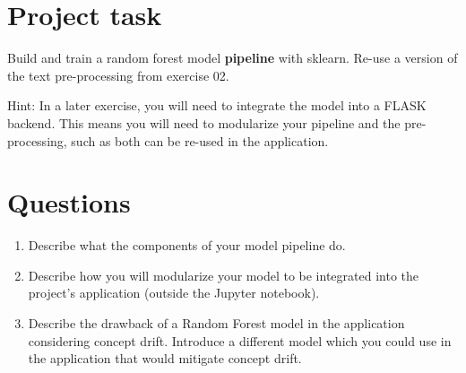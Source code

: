 

\newcommand{\dozenten}{Prof.~Dr.~Steffen Herbold}
\newcommand{\vorlesung}{Principles of AI Engineering}
\newcommand{\docauthor}{Lukas Schulte}
\newcommand{\semester}{}
\newcommand{\blattnummer}{3}
\newcommand{\bistermin}{}



\section*{Project task}

Build and train a random forest model \textbf{pipeline} with sklearn. Re-use a version of the text pre-processing from exercise 02.

\vspace{5px}

Hint:
In a later exercise, you will need to integrate the model into a FLASK backend. This means you will need to modularize your pipeline and the pre-processing, such as both can be re-used in the application.


\section*{Questions}

\begin{enumerate}
      \item
            Describe what the components of your model pipeline do.
      \item
            Describe how you will modularize your model to be integrated into the project's application (outside the Jupyter notebook).
      \item
            Describe the drawback of a Random Forest model in the application considering concept drift.
            Introduce a different model which you could use in the application that would mitigate concept drift.
\end{enumerate}


